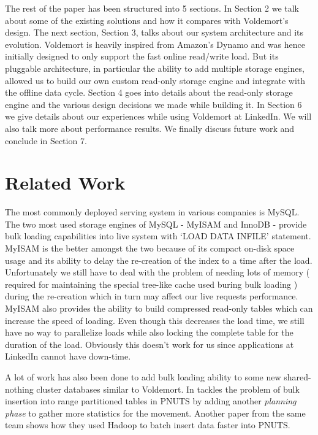 \documentclass[10pt,twocolumn,preprint,natbib,authoryear]{sigplanconf}
\begin{document}
The rest of the paper has been structured into 5 sections. In Section 2 we talk about some of the existing solutions and how it compares with Voldemort's design. The next section, Section 3,  talks about our system architecture and its evolution. Voldemort is heavily inspired from Amazon's Dynamo\cite{5} and was hence initially designed to only support the fast online read/write load. But its pluggable architecture, in particular the ability to add multiple storage engines, allowed us to build our own custom read-only storage engine and integrate with the offline data cycle. Section 4 goes into details about the read-only storage engine and the various design decisions we made while building it. In Section 6 we give details about our experiences while using Voldemort at LinkedIn. We will also talk more about performance results. We finally discuss future work and conclude in Section 7. 


\section{Related Work}
The most commonly deployed serving system in various companies is MySQL. The two most used storage engines of MySQL - MyISAM and InnoDB - provide bulk loading capabilities into live system with `LOAD DATA INFILE' statement. MyISAM is the better amongst the two because of its compact on-disk space usage and its ability to delay the re-creation of the index to a time after the load\cite{6 - http://dev.mysql.com/doc/refman/5.5/en/optimizing-myisam-bulk-data-loading.html}.  Unfortunately we still have to deal with the problem of needing lots of memory ( required for maintaining the special tree-like cache used buring bulk loading \cite{http://dev.mysql.com/doc/refman/5.1/en/server-system-variables.html-sysvar_bulk_insert_buffer_size}) during the re-creation which in turn may affect our live requests performance. MyISAM also provides the ability to build compressed read-only tables \cite{7 - http://dev.mysql.com/doc/refman/5.5/en/myisampack.html} which can increase the speed of loading. Even though this decreases the load time, we still have no way to parallelize loads while also locking the complete table for the duration of the load. Obviously this doesn't work for us since applications at LinkedIn cannot have down-time. 

A lot of work has also been done to add bulk loading ability to some new shared-nothing cluster\cite{The Case for Shared Nothing Database} databases similar to Voldemort. In \cite{8 - Efﬁcient Bulk Insertion into a Distributed Ordered Table} tackles the problem of bulk insertion into range partitioned tables in PNUTS \cite{9 - PNUTS paper} by adding another \emph {planning phase} to gather more statistics for the movement. Another paper from the same team \cite{A Batch of PNUTS: Experiences Connecting Cloud Batch and Serving Systems} shows how they used Hadoop to batch insert data faster into PNUTS.
\end{document}
